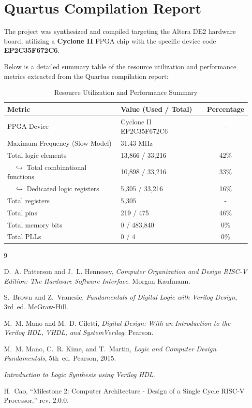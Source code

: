 \section{Quartus Compilation Report}

The project was synthesized and compiled targeting the Altera DE2 hardware board, utilizing a \textbf{Cyclone II} FPGA chip with the specific device code \textbf{EP2C35F672C6}. 

Below is a detailed summary table of the resource utilization and performance metrics extracted from the Quartus compilation report:

\begin{table}[H]
	\centering
	\renewcommand{\arraystretch}{1.2} %
	\begin{tabular}{llc}
		\toprule
		\textbf{Metric} & \textbf{Value (Used / Total)} & \textbf{Percentage} \\ \midrule
		FPGA Device & Cyclone II EP2C35F672C6 & - \\ 
		Maximum Frequency (Slow Model) & 31.43 MHz & - \\ 
		Total logic elements & 13,866 / 33,216 & 42\% \\ 
		$\quad \hookrightarrow$ Total combinational functions & 10,898 / 33,216 & 33\% \\
		$\quad \hookrightarrow$ Dedicated logic registers & 5,305 / 33,216 & 16\% \\
		Total registers & 5,305 & - \\ 
		Total pins & 219 / 475 & 46\% \\ 
		Total memory bits & 0 / 483,840 & 0\% \\ 
		Total PLLs & 0 / 4 & 0\% \\
		\bottomrule
	\end{tabular}
	\caption{Resource Utilization and Performance Summary}
\end{table}
\newpage

\begin{thebibliography}{9}
	
	D.~A. Patterson and J.~L. Hennessy, \emph{Computer Organization and Design RISC-V Edition: The Hardware Software Interface}. Morgan Kaufmann.
	
	S.~Brown and Z.~Vranesic, \emph{Fundamentals of Digital Logic with Verilog Design}, 3rd~ed. McGraw-Hill.
	
	M.~M. Mano and M.~D. Ciletti, \emph{Digital Design: With an Introduction to the Verilog HDL, VHDL, and SystemVerilog}. Pearson.
	
	M.~M. Mano, C.~R. Kime, and T.~Martin, \emph{Logic and Computer Design Fundamentals}, 5th~ed. Pearson, 2015.
	
	\emph{Introduction to Logic Synthesis using Verilog HDL}.
	
	H.~Cao, ``Milestone 2: Computer Architecture - Design of a Single Cycle RISC-V Processor,'' rev. 2.0.0.
	
\end{thebibliography}
\newpage 
